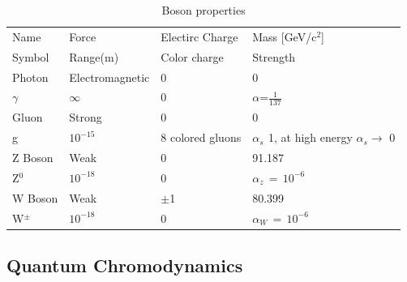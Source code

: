 \begin{table}[bht]
\caption[]{Boson properties}
\label{tab:StandardModelBoson}
\begin{tabular}{llll}
Name                                  &Force           &Electirc Charge         &Mass [GeV/c$^2$] \\
Symbol                                &Range(m)        &Color charge            &Strength        \\

\hline
Photon                                &Electromagnetic   &0                        &0                        \\
$\gamma$                              &$\infty$          &0                        &$\alpha$=$\frac{1}{137}$  \\

\hline
Gluon                                 &Strong            &0                        &0                        \\
g                                     &$10^{-15}$          &8 colored gluons         &$\alpha_s\,~$1, at high energy $\alpha_s \rightarrow$ 0\\

\hline
Z Boson                               &Weak               &0                        &91.187                        \\
Z$^0$                                 &$10^{-18}$           &0                        &$\alpha_z\,=\,10^{-6}$         \\

\hline
W Boson                              &Weak                &$\pm$1                   &80.399                        \\
W$^{\pm}$                             &$10^{-18}$            &0                        &$\alpha_W\,=\,10^{-6}$         \\
\end{tabular}
\end{table}




\subsection{Quantum Chromodynamics}

